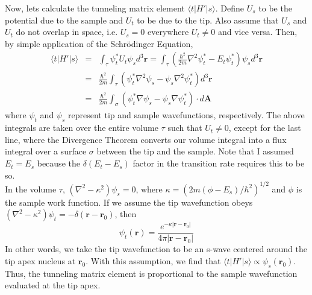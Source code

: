 \documentclass[a4paper,12pt]{article}
\renewcommand{\vec}[1]{\boldsymbol{\mathbf{#1}}}
\begin{document}
Now, lets calculate the tunneling matrix element $\langle t | H' | s \rangle$.  Define $U_s$ to be the potential due to the sample and $U_t$ to be due to the tip.  Also assume that $U_s$ and $U_t$ do not overlap in space, i.e. $U_s=0$ everywhere $U_t \ne 0$ and vice versa.  Then, by simple application of the Schr\"{o}dinger Equation,
\begin{eqnarray}
\langle t | H' | s \rangle &=& \int_{\tau} \psi_t^* U_t \psi_s d^3\vec{r}=\int_{\tau} \left( \frac{\hbar^2}{2m} \nabla^2 \psi_t^*-E_t \psi_t^* \right) \psi_s d^3\vec{r} \nonumber \\
&=& \frac{\hbar^2}{2m} \int_{\tau} \left( \psi_t^* \nabla^2 \psi_s - \psi_s \nabla^2 \psi_t^* \right) d^3\vec{r} \nonumber \\
&=& \frac{\hbar^2}{2m} \int_{\sigma} \left( \psi_t^* \nabla \psi_s - \psi_s \nabla \psi_t^* \right) \cdot d\vec{A}
\end{eqnarray}
where $\psi_t$ and $\psi_s$ represent tip and sample wavefunctions, respectively.  The above integrals are taken over the entire volume $\tau$ such that $U_t \ne 0$, except for the last line, where the Divergence Theorem converts our volume integral into a flux integral over a surface $\sigma$ between the tip and the sample.  Note that I assumed $E_t=E_s$ because the $\delta(E_t-E_s)$ factor in the transition rate requires this to be so. \\
In the volume $\tau$, $(\nabla^2-\kappa^2)\psi_s=0$, where $\kappa=(2m(\phi-E_s)/\hbar^2)^{1/2}$ and $\phi$ is the sample work function.  If we assume the tip wavefunction obeys $(\nabla^2-\kappa^2)\psi_t=-\delta(\vec{r}-\vec{r}_0)$, then
\begin{equation}
\psi_t(\vec{r})=\frac{e^{-\kappa |\vec{r}-\vec{r}_0|}}{4 \pi |\vec{r}-\vec{r}_0|}
\end{equation}
In other words, we take the tip wavefunction to be an s-wave centered around the tip apex nucleus at $\vec{r}_0$.  With this assumption, we find that $\langle t | H' | s \rangle \propto \psi_s(\vec{r}_0)$.  Thus, the tunneling matrix element is proportional to the sample wavefunction evaluated at the tip apex. \\
\end{document}
